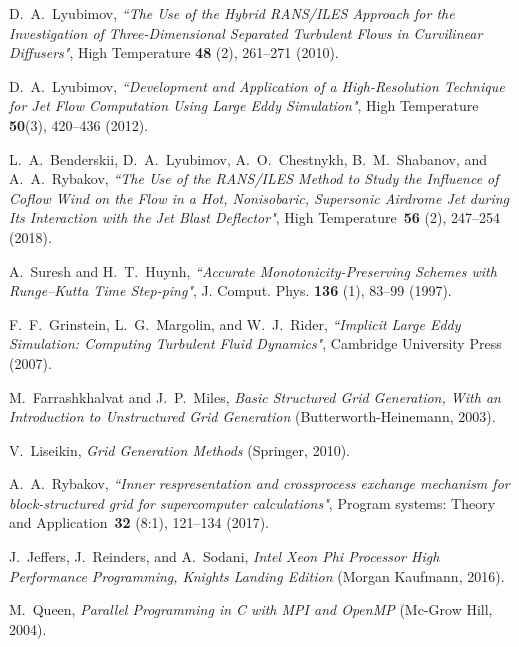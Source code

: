 \documentclass[
11pt,%
tightenlines,%
twoside,%
onecolumn,%
nofloats,%
nobibnotes,%
nofootinbib,%
superscriptaddress,%
noshowpacs,%
centertags]%
{revtex4}
\begin{document}
\begin{thebibliography}{99}


 D.~A.~Lyubimov, {\it ``The Use of the Hybrid
RANS/ILES Approach for the Investigation  of Three-Dimensional
Separated Turbulent Flows in Curvilinear Diffusers"}, High
Temperature {\bf 48} (2), 261--271 (2010).

 D.~A.~Lyubimov, {\it ``Development and Application
of a High-Resolution Technique for Jet Flow Computation Using Large
Eddy Simulation"}, High Temperature {\bf 50}(3), 420--436 (2012).

 L.~A.~Benderskii, D.~A.~Lyubimov, A.~O.~Chestnykh,
B.~M.~Shabanov, and A.~A.~Rybakov, {\it ``The Use of the RANS/ILES
Method to Study the Influence of Coflow Wind on the Flow in a Hot,
Nonisobaric, Supersonic Airdrome Jet during Its Interaction with the
Jet Blast Deflector"}, High Temperature~{\bf 56} (2), 247--254
(2018).

 A.~Suresh and H.~T.~Huynh, {\it ``Accurate
Monotonicity-Preserving Schemes with Runge–Kutta Time Step-ping"},
J. Comput. Phys. {\bf 136} (1), 83--99 (1997).

 F.~F.~Grinstein, L.~G.~Margolin, and W.~J.~Rider,
{\it ``Implicit Large Eddy Simulation: Computing Turbulent Fluid
Dynamics"}, Cambridge University Press (2007).



 M.~Farrashkhalvat and J.~P.~Miles, \emph{Basic
Structured Grid Generation, With an Introduction to Unstructured
Grid Generation} (Butterworth-Heinemann, 2003).

 V.~Liseikin, \emph{Grid Generation Methods}
(Springer, 2010).

 A.~A.~Rybakov, {\it ``Inner respresentation and
crossprocess  exchange mechanism for block-structured grid for
supercomputer calculations"}, Program systems: Theory and
Application~{\bf 32} (8:1), 121--134 (2017).

 J.~Jeffers, J.~Reinders, and A.~Sodani, \emph{Intel
Xeon Phi Processor High Performance Programming, Knights Landing
Edition} (Morgan Kaufmann, 2016).

 M.~Queen, \emph{Parallel Programming in C with MPI
and OpenMP} (Mc-Grow Hill, 2004).

\end{thebibliography}
\end{document}
